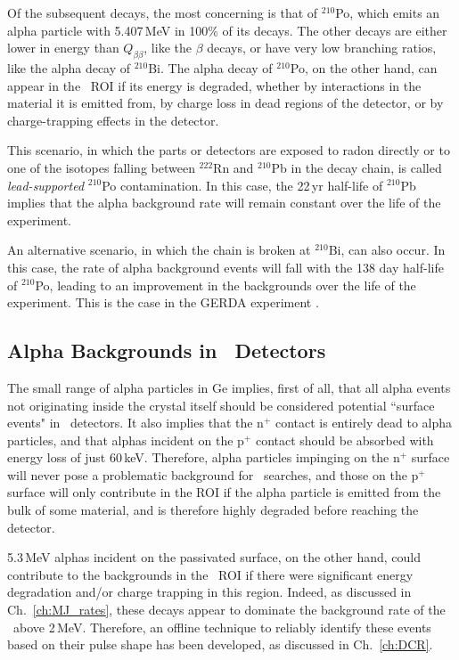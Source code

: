 Of the subsequent decays, the most concerning is that of $^{210}$Po, which emits an alpha particle with 5.407\,MeV in 100\% of its decays. The other decays are either lower in energy than $Q_{\beta \beta}$, like the $\beta$ decays, or have very low branching ratios, like the alpha decay of $^{210}$Bi. The alpha decay of $^{210}$Po, on the other hand, can appear in the \nonubb\ ROI if its energy is degraded, whether by interactions in the material it is emitted from, by charge loss in dead regions of the detector, or by charge-trapping effects in the detector.  

This scenario, in which the parts or detectors are exposed to radon directly or to one of the isotopes falling between $^{222}$Rn and $^{210}$Pb in the decay chain, is called \textit{lead-supported} $^{210}$Po contamination. In this case, the 22\,yr half-life of $^{210}$Pb implies that the alpha background rate will remain constant over the life of the experiment. 

An alternative scenario, in which the chain is broken at $^{210}$Bi, can also occur. In this case, the rate of alpha background events will fall with the 138 day half-life of $^{210}$Po, leading to an improvement in the backgrounds over the life of the experiment. This is the case in the GERDA experiment \cite{GERDA_Background2013}. 

\subsection{Alpha Backgrounds in \ppc\ Detectors}
The small range of alpha particles in Ge implies, first of all, that all alpha events not originating inside the crystal itself should be considered potential ``surface events" in \ppc\ detectors. It also implies that the n$^+$ contact is entirely dead to alpha particles, and that alphas incident on the p$^+$ contact should be absorbed with energy loss of just 60\,keV. Therefore, alpha particles impinging on the n$^+$ surface will never pose a problematic background for \nonubb\ searches, and those on the p$^+$ surface will only contribute in the ROI if the alpha particle is emitted from the bulk of some material, and is therefore highly degraded before reaching the detector.

5.3\,MeV alphas incident on the passivated surface, on the other hand, could contribute to the backgrounds in the \nonubb\ ROI if there were significant energy degradation and/or charge trapping in this region. Indeed, as discussed in Ch.~\ref{ch:MJ_rates}, these decays appear to dominate the background rate of the \DEM\ above 2\,MeV. Therefore, an offline technique to reliably identify these events based on their pulse shape has been developed, as discussed in Ch.~\ref{ch:DCR}. 


